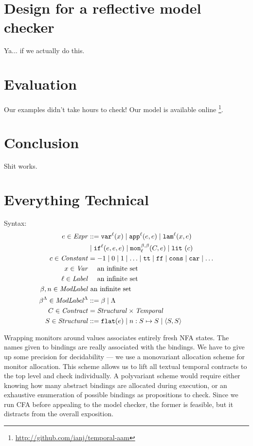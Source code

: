 \documentclass[preprint,onecolumn,9pt]{sigplanconf} %
\begin{document}
\section{Design for a reflective model checker}

Ya... if we actually do this.

\section{Evaluation}

Our examples didn't take hours to check!
%
Our model is available online \footnote{\url{http://github.com/ianj/temporal-aam}}.

\section{Conclusion}

Shit works.

\section{Everything Technical}\label{sec:technical}

Syntax:
\begin{align*}
\mexp \in \Expr &::=
      \svar[^\mlab]{\mvar}
 \alt \sapp[^\mlab]{\mexp}{\mexp}
 \alt \slam[^\mlab]{\mvar}{\mexp} \\
&\alt \sif[^\mlab]{\mexp}{\mexp}{\mexp} 
 \alt \sMon{\mmlab}{\mmlab}{\mlab}{\mcontract, \mexp}
 \alt \slit{\mconstant} \\
\mconstant \in \Constant &= -1 \alt 0 \alt 1 \alt \ldots \alt \strue \alt \sfalse \alt \scons \alt \scar \alt \ldots \\
\mvar \in \Var &\quad\text{ an infinite set} \\
\mlab \in \Label &\quad\text{ an infinite set} \\
\mmlab,\mname \in \ModuleLabel &\text{ an infinite set} \\
\msmlab \in \ModuleLabel^{\toplevel} &::= \mmlab \alt \toplevel \\
\mcontract \in \Contract &= \SContract \times \TContract \\
\mscon \in \SContract &::= \sflat{\mexp} \alt \sarr{\mname}{\mscon}{\mscon} \alt \sconsc{\mscon}{\mscon} \\
\end{align*}

Wrapping monitors around values associates entirely fresh NFA states.
%
The names given to bindings are really associated with the bindings.
%
We have to give up some precision for decidability --- we use a monovariant allocation scheme for monitor allocation.
%
This scheme allows us to lift all textual temporal contracts to the top level and check individually.
%
A polyvariant scheme would require either knowing how many abstract bindings are allocated during execution, or an exhaustive enumeration of possible bindings as propositions to check.
%
Since we run CFA before appealing to the model checker, the former is feasible, but it distracts from the overall exposition.
\end{document}
